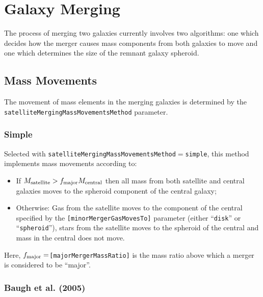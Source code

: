 \section{Galaxy Merging}

The process of merging two galaxies currently involves two algorithms: one which decides how the merger causes mass components from both galaxies to move and one which determines the size of the remnant galaxy spheroid.

\subsection{Mass Movements}\label{sec:MergingMassMovements}

The movement of mass elements in the merging galaxies is determined by the {\tt satelliteMergingMassMovementsMethod} parameter. 

\subsubsection{Simple}

Selected with {\tt satelliteMergingMassMovementsMethod}$=${\tt simple}, this method implements mass movements according to:
\begin{itemize}
 \item If $M_{\rm satellite} > f_{\rm major} M_{\rm central}$ then all mass from both satellite and central galaxies moves to the spheroid component of the central galaxy;
 \item Otherwise: Gas from the satellite moves to the component of the central specified by the {\tt [minorMergerGasMovesTo]} parameter (either ``{\tt disk}'' or ``{\tt spheroid}''), stars from the satellite moves to the spheroid of the central and mass in the central does not move.
\end{itemize}
Here, $f_{\rm major}=${\tt [majorMergerMassRatio]} is the mass ratio above which a merger is considered to be ``major''.

\subsubsection{Baugh et al. (2005)}

